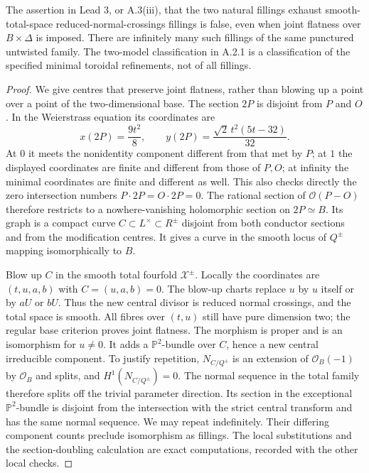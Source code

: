 \begin{proposition}\label{push:src:A.3.3}\label{push:A33}
The assertion in Lead 3, or A.3(iii), that the two natural
fillings exhaust smooth-total-space reduced-normal-crossings
fillings is false, even when joint flatness over
$B\times\Delta$ is imposed. There are infinitely many such
fillings of the same punctured untwisted family. The
two-model classification in A.2.1 is a classification of the
specified minimal toroidal refinements, not of all fillings.
\end{proposition}
\begin{proof}
We give centres that preserve joint flatness, rather than
blowing up a point over a point of the two-dimensional base.
The section $2P$ is disjoint from $P$ and $O$. In the
Weierstrass equation its coordinates are
\[
 x(2P)=\frac{9t^2}{8},\qquad
 y(2P)=\frac{\sqrt2\,t^2(5t-32)}{32}.
\]
At $0$ it meets the nonidentity component different from
that met by $P$; at $1$ the displayed coordinates are finite
and different from those of $P,O$; at infinity the minimal
coordinates are finite and different as well. This also
checks directly the zero intersection numbers
$P\cdot2P=O\cdot2P=0$. The rational section of
$\mathcal O(P-O)$ therefore restricts to a nowhere-vanishing
holomorphic section on $2P\simeq B$. Its graph is a compact
curve $C\subset L^\times\subset R^\pm$ disjoint from both
conductor sections and from the modification centres.
It gives a curve in the smooth locus of $Q^\pm$ mapping
isomorphically to $B$.

Blow up $C$ in the smooth total fourfold $\mathcal X^\pm$.
Locally the coordinates are $(t,u,a,b)$ with
$C=(u,a,b)=0$. The blow-up charts replace $u$ by $u$ itself
or by $aU$ or $bU$. Thus the new central divisor is reduced
normal crossings, and the total space is smooth. All fibres
over $(t,u)$ still have pure dimension two; the regular base
criterion proves joint flatness. The morphism is proper and
is an isomorphism for $u\ne0$. It adds a
$\mathbb P^2$-bundle over $C$, hence a new central irreducible
component. To justify repetition, $N_{C/Q^\pm}$ is an extension
of $\mathcal O_B(-1)$ by $\mathcal O_B$ and splits, and
$H^1(N_{C/Q^\pm})=0$. The normal sequence in the total family
therefore splits off the trivial parameter direction. Its
section in the exceptional $\mathbb P^2$-bundle is disjoint
from the intersection with the strict central transform and
has the same normal sequence. We may repeat indefinitely.
Their differing component counts preclude
isomorphism as fillings. The local substitutions and the
section-doubling calculation are exact computations, recorded
with the other local checks.
\end{proof}

